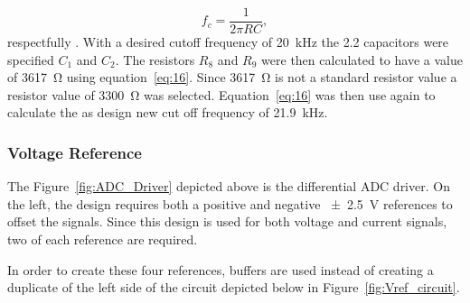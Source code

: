 \begin{equation}
    f_{c}   = \frac{1}{2 \pi R C},
    \label{eq:16}
\end{equation}
respectfully \cite{design_with}.
With a  desired cutoff frequency of \qty{20}{\kHz} the \qty{2.2}{\nF} capacitors  were specified $C_{1}$ and $C_{2}$. The resistors $R_{8}$ and $R_{9}$ were then calculated to have a value of  \qty{3617}{\ohm} using equation~\ref{eq:16}. Since \qty{3617}{\ohm} is not a standard resistor value a resistor value of  \qty{3300}{\ohm} was selected. Equation~\ref{eq:16} was then use again to calculate the as design new cut off frequency of \qty{21.9}{\kHz}. 


\subsubsection{Voltage Reference}
\label{sec:D_ref}
The Figure~\ref{fig:ADC_Driver} depicted above is the differential ADC driver. On the left, the design requires both a positive and negative \qty{\pm 2.5}{\volt} references to offset the signals. Since this design is used for both voltage and current signals, two of each reference are required.
\par
In order to create these four references, buffers are used instead of creating a duplicate of the left side of the circuit depicted below in Figure~\ref{fig:Vref_circuit}.

